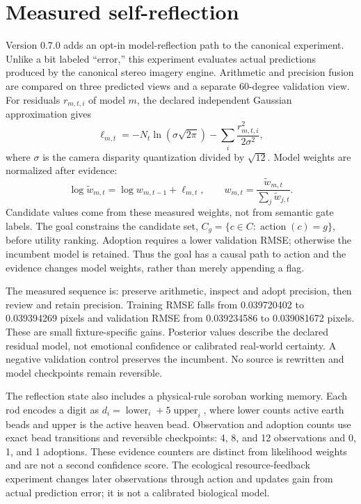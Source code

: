 \documentclass[11pt,a4paper]{article}
\begin{document}
\section{Measured self-reflection}
Version 0.7.0 adds an opt-in model-reflection path to the canonical experiment. Unlike a bit labeled ``error,'' this experiment evaluates actual predictions produced by the canonical stereo imagery engine. Arithmetic and precision fusion are compared on three predicted views and a separate 60-degree validation view. For residuals $r_{m,t,i}$ of model $m$, the declared independent Gaussian approximation gives
\begin{equation}
\ell_{m,t}=-N_t\ln(\sigma\sqrt{2\pi})-\sum_i\frac{r_{m,t,i}^2}{2\sigma^2},
\end{equation}
where $\sigma$ is the camera disparity quantization divided by $\sqrt{12}$. Model weights are normalized after evidence:
\begin{equation}
\log\tilde w_{m,t}=\log w_{m,t-1}+\ell_{m,t},\qquad
w_{m,t}=\frac{\tilde w_{m,t}}{\sum_j\tilde w_{j,t}}.
\end{equation}
Candidate values come from these measured weights, not from semantic gate labels. The goal constrains the candidate set, $C_g=\{c\in C:\operatorname{action}(c)=g\}$, before utility ranking. Adoption requires a lower validation RMSE; otherwise the incumbent model is retained. Thus the goal has a causal path to action and the evidence changes model weights, rather than merely appending a flag.

The measured sequence is: preserve arithmetic, inspect and adopt precision, then review and retain precision. Training RMSE falls from 0.039720402 to 0.039394269 pixels and validation RMSE from 0.039234586 to 0.039081672 pixels. These are small fixture-specific gains. Posterior values describe the declared residual model, not emotional confidence or calibrated real-world certainty. A negative validation control preserves the incumbent. No source is rewritten and model checkpoints remain reversible.

The reflection state also includes a physical-rule soroban working memory. Each rod encodes a digit as $d_i=\operatorname{lower}_i+5\operatorname{upper}_i$, where lower counts active earth beads and upper is the active heaven bead. Observation and adoption counts use exact bead transitions and reversible checkpoints: 4, 8, and 12 observations and 0, 1, and 1 adoptions. These evidence counters are distinct from likelihood weights and are not a second confidence score. The ecological resource-feedback experiment changes later observations through action and updates gain from actual prediction error; it is not a calibrated biological model.
\end{document}
